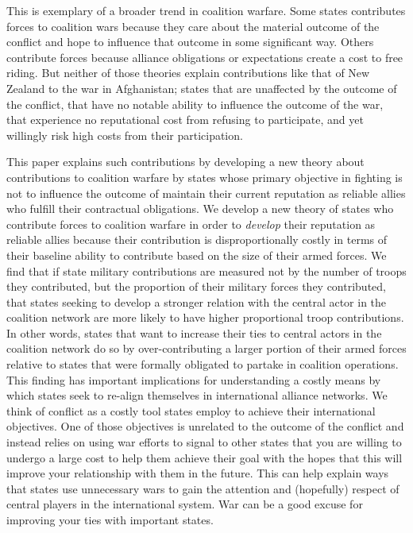 \documentclass[12pt,letterpaper]{article}
\begin{document}
	This is exemplary of a broader trend in coalition warfare. Some states contributes forces to coalition wars because they care about the material outcome of the conflict and hope to influence that outcome in some significant way. Others contribute forces because alliance obligations or expectations create a cost to free riding. But neither of those theories explain contributions like that of New Zealand to the war in Afghanistan; states that are unaffected by the outcome of the conflict, that have no notable ability to influence the outcome of the war, that experience no reputational cost from refusing to participate, and yet willingly risk high costs from their participation.
	
	This paper explains such contributions by developing a new theory about contributions to coalition warfare by states whose primary objective in fighting is not to influence the outcome of maintain their current reputation as reliable allies who fulfill their contractual obligations. We develop a new theory of states who contribute forces to coalition warfare in order to \textit{develop} their reputation as reliable allies because their contribution is disproportionally costly in terms of their baseline ability to contribute based on the size of their armed forces. We find that if state military contributions are measured not by the number of troops they contributed, but the proportion of their military forces they contributed, that states seeking to develop a stronger relation with the central actor in the coalition network are more likely to have higher proportional troop contributions. In other words, states that want to increase their ties to central actors in the coalition network do so by over-contributing a larger portion of their armed forces relative to states that were formally obligated to partake in coalition operations. This finding has important implications for understanding a costly means by which states seek to re-align themselves in international alliance networks. We think of conflict as a costly tool states employ to achieve their international objectives. One of those objectives is unrelated to the outcome of the conflict and instead relies on using war efforts to signal to other states that you are willing to undergo a large cost to help them achieve their goal with the hopes that this will improve your relationship with them in the future. This can help explain ways that states use unnecessary wars to gain the attention and (hopefully) respect of central players in the international system. War can be a good excuse for improving your ties with important states.
	
\end{document}
